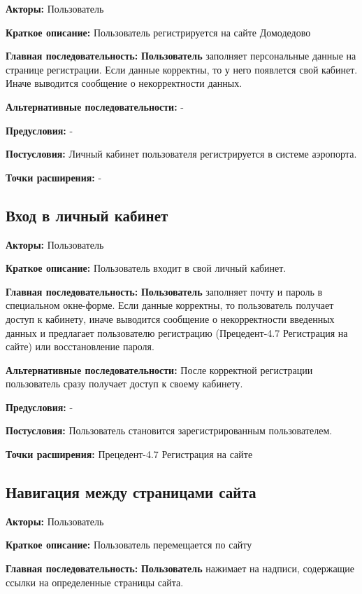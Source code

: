 \textbf{Акторы:} Пользователь

\textbf{Краткое описание:} Пользователь регистрируется на сайте Домодедово

\textbf{Главная последовательность:} \textbf{Пользователь} заполняет персональные данные на странице регистрации.
Если данные корректны, то у него появлется свой кабинет. Иначе выводится сообщение о некорректности данных.

\textbf{Альтернативные последовательности:} -

\textbf{Предусловия:} -

\textbf{Постусловия:} Личный кабинет пользователя регистрируется в системе аэропорта.

\textbf{Точки расширения:} -




\subsection{Вход в личный кабинет}

\textbf{Акторы:} Пользователь

\textbf{Краткое описание:} Пользователь входит в свой личный кабинет.

\textbf{Главная последовательность:} \textbf{Пользователь} заполняет почту и пароль в специальном окне-форме. Если данные корректны, то 
пользователь получает доступ к кабинету, иначе выводится сообщение о некорректности введенных данных и предлагает пользователю регистрацию
(Прецедент-4.7 Регистрация на сайте) или восстановление пароля.

\textbf{Альтернативные последовательности:} После корректной регистрации пользователь сразу получает доступ к своему кабинету.

\textbf{Предусловия:} -

\textbf{Постусловия:} Пользователь становится зарегистрированным пользователем.

\textbf{Точки расширения:} Прецедент-4.7 Регистрация на сайте




\subsection{Навигация между страницами сайта}

\textbf{Акторы:} Пользователь

\textbf{Краткое описание:} Пользователь перемещается по сайту

\textbf{Главная последовательность:} \textbf{Пользователь} нажимает на надписи, содержащие ссылки на определенные страницы сайта.


